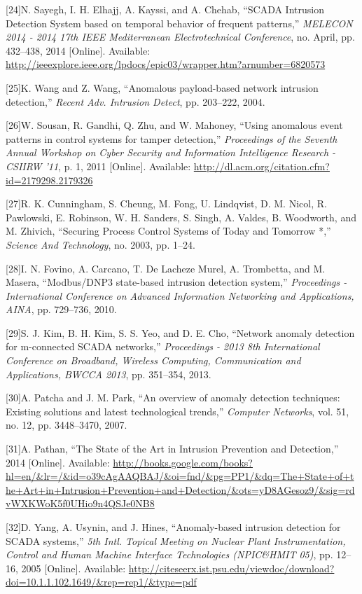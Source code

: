 \documentclass[11pt,a4paper]{article}
\begin{document}
{[}24{]}N. Sayegh, I. H. Elhajj, A. Kayssi, and A. Chehab, ``SCADA
Intrusion Detection System based on temporal behavior of frequent
patterns,'' \emph{MELECON 2014 - 2014 17th IEEE Mediterranean
Electrotechnical Conference}, no. April, pp. 432--438, 2014
{[}Online{]}. Available:
\url{http://ieeexplore.ieee.org/lpdocs/epic03/wrapper.htm?arnumber=6820573}

{[}25{]}K. Wang and Z. Wang, ``Anomalous payload-based network intrusion
detection,'' \emph{Recent Adv. Intrusion Detect}, pp. 203--222, 2004.

{[}26{]}W. Sousan, R. Gandhi, Q. Zhu, and W. Mahoney, ``Using anomalous
event patterns in control systems for tamper detection,''
\emph{Proceedings of the Seventh Annual Workshop on Cyber Security and
Information Intelligence Research - CSIIRW '11}, p. 1, 2011
{[}Online{]}. Available:
\url{http://dl.acm.org/citation.cfm?id=2179298.2179326}

{[}27{]}R. K. Cunningham, S. Cheung, M. Fong, U. Lindqvist, D. M. Nicol,
R. Pawlowski, E. Robinson, W. H. Sanders, S. Singh, A. Valdes, B.
Woodworth, and M. Zhivich, ``Securing Process Control Systems of Today
and Tomorrow *,'' \emph{Science And Technology}, no. 2003, pp. 1--24.

{[}28{]}I. N. Fovino, A. Carcano, T. {De Lacheze Murel}, A. Trombetta,
and M. Masera, ``Modbus/DNP3 state-based intrusion detection system,''
\emph{Proceedings - International Conference on Advanced Information
Networking and Applications, AINA}, pp. 729--736, 2010.

{[}29{]}S. J. Kim, B. H. Kim, S. S. Yeo, and D. E. Cho, ``Network
anomaly detection for m-connected SCADA networks,'' \emph{Proceedings -
2013 8th International Conference on Broadband, Wireless Computing,
Communication and Applications, BWCCA 2013}, pp. 351--354, 2013.

{[}30{]}A. Patcha and J. M. Park, ``An overview of anomaly detection
techniques: Existing solutions and latest technological trends,''
\emph{Computer Networks}, vol. 51, no. 12, pp. 3448--3470, 2007.

{[}31{]}A. Pathan, ``The State of the Art in Intrusion Prevention and
Detection,'' 2014 {[}Online{]}. Available:
\url{http://books.google.com/books?hl=en/\&lr=/\&id=o39cAgAAQBAJ/\&oi=fnd/\&pg=PP1/\&dq=The+State+of+the+Art+in+Intrusion+Prevention+and+Detection/\&ots=yD8AGesoz9/\&sig=rdvWXKWoK5f0UHio9n4QSJe0NB8}

{[}32{]}D. Yang, A. Usynin, and J. Hines, ``Anomaly-based intrusion
detection for SCADA systems,'' \emph{5th Intl. Topical Meeting on
Nuclear Plant Instrumentation, Control and Human Machine Interface
Technologies (NPIC\&HMIT 05)}, pp. 12--16, 2005 {[}Online{]}. Available:
\url{http://citeseerx.ist.psu.edu/viewdoc/download?doi=10.1.1.102.1649/\&rep=rep1/\&type=pdf}
\end{document}
